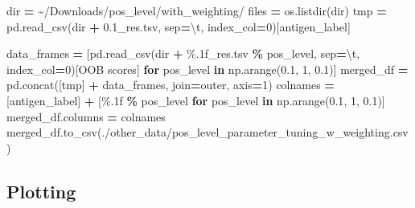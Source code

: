 \documentclass[
  11pt,
  oneside]{book}
\newenvironment{Shaded}{\begin{snugshade}}{\end{snugshade}}
\newcommand{\BuiltInTok}[1]{#1}
\newcommand{\CharTok}[1]{\textcolor[rgb]{0.31,0.60,0.02}{#1}}
\newcommand{\ControlFlowTok}[1]{\textcolor[rgb]{0.13,0.29,0.53}{\textbf{#1}}}
\newcommand{\DecValTok}[1]{\textcolor[rgb]{0.00,0.00,0.81}{#1}}
\newcommand{\FloatTok}[1]{\textcolor[rgb]{0.00,0.00,0.81}{#1}}
\newcommand{\KeywordTok}[1]{\textcolor[rgb]{0.13,0.29,0.53}{\textbf{#1}}}
\newcommand{\NormalTok}[1]{#1}
\newcommand{\OperatorTok}[1]{\textcolor[rgb]{0.81,0.36,0.00}{\textbf{#1}}}
\newcommand{\SpecialCharTok}[1]{\textcolor[rgb]{0.00,0.00,0.00}{#1}}
\newcommand{\StringTok}[1]{\textcolor[rgb]{0.31,0.60,0.02}{#1}}
\begin{document}
\begin{Shaded}
\begin{Highlighting}[]
\BuiltInTok{dir} \OperatorTok{=} \StringTok{\textquotesingle{}\textasciitilde{}/Downloads/pos\_level/with\_weighting/\textquotesingle{}}
\NormalTok{files }\OperatorTok{=}\NormalTok{ os.listdir(}\BuiltInTok{dir}\NormalTok{)}
\NormalTok{tmp }\OperatorTok{=}\NormalTok{ pd.read\_csv(}\BuiltInTok{dir} \OperatorTok{+} \StringTok{\textquotesingle{}0.1\_res.tsv\textquotesingle{}}\NormalTok{, sep}\OperatorTok{=}\StringTok{\textquotesingle{}}\CharTok{\textbackslash{}t}\StringTok{\textquotesingle{}}\NormalTok{, index\_col}\OperatorTok{=}\DecValTok{0}\NormalTok{)[}\StringTok{\textquotesingle{}antigen\_label\textquotesingle{}}\NormalTok{]}

\NormalTok{data\_frames }\OperatorTok{=}\NormalTok{ [pd.read\_csv(}\BuiltInTok{dir} \OperatorTok{+} \StringTok{\textquotesingle{}}\SpecialCharTok{\%.1f}\StringTok{\_res.tsv\textquotesingle{}} \OperatorTok{\%}\NormalTok{ pos\_level, sep}\OperatorTok{=}\StringTok{\textquotesingle{}}\CharTok{\textbackslash{}t}\StringTok{\textquotesingle{}}\NormalTok{, index\_col}\OperatorTok{=}\DecValTok{0}\NormalTok{)[}\StringTok{\textquotesingle{}OOB scores\textquotesingle{}}\NormalTok{] }\ControlFlowTok{for}\NormalTok{ pos\_level }\KeywordTok{in}\NormalTok{ np.arange(}\FloatTok{0.1}\NormalTok{, }\DecValTok{1}\NormalTok{, }\FloatTok{0.1}\NormalTok{)]}
\NormalTok{merged\_df }\OperatorTok{=}\NormalTok{ pd.concat([tmp] }\OperatorTok{+}\NormalTok{ data\_frames, join}\OperatorTok{=}\StringTok{\textquotesingle{}outer\textquotesingle{}}\NormalTok{, axis}\OperatorTok{=}\DecValTok{1}\NormalTok{)}
\NormalTok{colnames }\OperatorTok{=}\NormalTok{ [}\StringTok{\textquotesingle{}antigen\_label\textquotesingle{}}\NormalTok{] }\OperatorTok{+}\NormalTok{ [}\StringTok{\textquotesingle{}}\SpecialCharTok{\%.1f}\StringTok{\textquotesingle{}} \OperatorTok{\%}\NormalTok{ pos\_level }\ControlFlowTok{for}\NormalTok{ pos\_level }\KeywordTok{in}\NormalTok{ np.arange(}\FloatTok{0.1}\NormalTok{, }\DecValTok{1}\NormalTok{, }\FloatTok{0.1}\NormalTok{)]}
\NormalTok{merged\_df.columns }\OperatorTok{=}\NormalTok{ colnames}
\NormalTok{merged\_df.to\_csv(}\StringTok{\textquotesingle{}./other\_data/pos\_level\_parameter\_tuning\_w\_weighting.csv\textquotesingle{}}\NormalTok{)}
\end{Highlighting}
\end{Shaded}

\hypertarget{plotting-2}{%
\subsection{Plotting}\label{plotting-2}}
\end{document}

